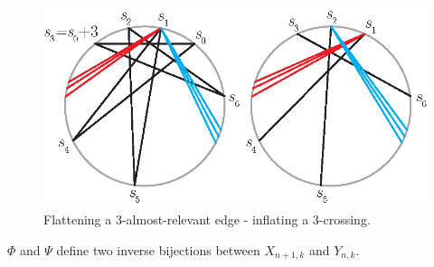 \documentclass[12pt]{amsart}
\begin{document}
\begin{figure}
\centerline{\includegraphics[scale=1]{flatinfl.eps}}
\caption{\small{Flattening a $3$-almost-relevant edge - inflating a $3$-crossing.}}\label{flatinfl}
\end{figure}

\begin{theorem}\label{flattening/inflating}
$\Phi$ and $\Psi$ define two inverse bijections between $X_{n+1,k}$ and $Y_{n,k}$.
\end{theorem}
\end{document}
